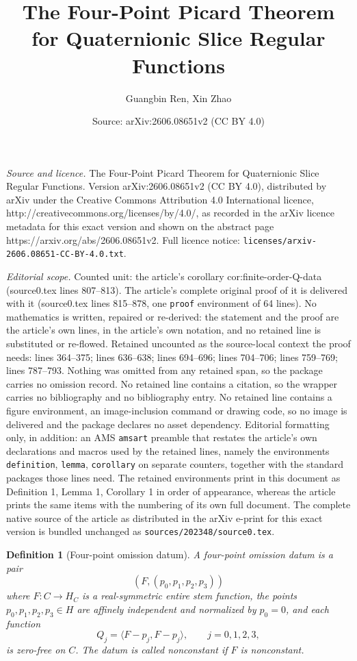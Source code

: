 \documentclass[10pt,a4paper]{amsart}
\title{The Four-Point Picard Theorem for Quaternionic Slice Regular Functions}
\author{Guangbin Ren, Xin Zhao}
\date{Source: arXiv:2606.08651v2 (CC BY 4.0)}
\newtheorem{definition}{Definition}
\def\CC{C}%
\def\HH{H}%
\def\HHc{H_C}%
\begin{document}
\maketitle

\noindent\emph{Source and licence.} The Four-Point Picard Theorem for Quaternionic Slice Regular Functions. Version arXiv:2606.08651v2 (CC BY 4.0), distributed by arXiv under the Creative Commons Attribution 4.0 International licence, http://creativecommons.org/licenses/by/4.0/, as recorded in the arXiv licence metadata for this exact version and shown on the abstract page https://arxiv.org/abs/2606.08651v2. Full licence notice: \texttt{licenses/arxiv-2606.08651-CC-BY-4.0.txt}.\par\smallskip

\noindent\textit{Editorial scope.} Counted unit: the article's corollary cor:finite-order-Q-data (source0.tex lines 807--813). The article's complete original proof of it is delivered with it (source0.tex lines 815--878, one \texttt{proof} environment of 64 lines). No mathematics is written, repaired or re-derived: the statement and the proof are the article's own lines, in the article's own notation, and no retained line is substituted or re-flowed.  Retained uncounted as the source-local context the proof needs: lines 364--375; lines 636--638; lines 694--696; lines 704--706; lines 759--769; lines 787--793.  Nothing was omitted from any retained span, so the package carries no omission record.  No retained line contains a citation, so the wrapper carries no bibliography and no bibliography entry.  No retained line contains a figure environment, an image-inclusion command or drawing code, so no image is delivered and the package declares no asset dependency.  Editorial formatting only, in addition: an AMS \texttt{amsart} preamble that restates the article's own declarations and macros used by the retained lines, namely the environments \texttt{definition}, \texttt{lemma}, \texttt{corollary} on separate counters, together with the standard packages those lines need.  The retained environments print in this document as Definition 1, Lemma 1, Corollary 1 in order of appearance, whereas the article prints the same items with the numbering of its own full document.  The complete native source of the article as distributed in the arXiv e-print for this exact version is bundled unchanged as \texttt{sources/202348/source0.tex}.
\begin{definition}[Four-point omission datum]\label{def:omission-datum}
A four-point omission datum is a pair
\[
(F,(p_0,p_1,p_2,p_3))
\]
where $F:\CC\to\HHc$ is a real-symmetric entire stem function, the points $p_0,p_1,p_2,p_3\in\HH$ are affinely independent and normalized by $p_0=0$, and each function
\[
Q_j=\langle F-p_j,F-p_j\rangle,
\qquad j=0,1,2,3,
\]
is zero-free on $\CC$.  The datum is called nonconstant if $F$ is nonconstant.
\end{definition}
\end{document}
